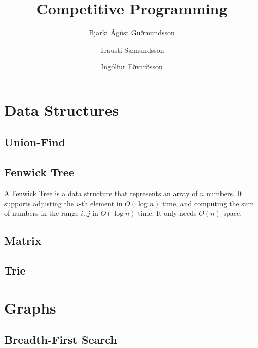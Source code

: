 \documentclass[11pt,a4paper,titlepage]{article}
\title{Competitive Programming}
\author{Bjarki Ágúst Guðmundsson \and Trausti Sæmundsson \and Ingólfur Eðvarðsson}
\begin{document}
	\maketitle
	\tableofcontents
	\newpage

	\section{Data Structures}

		\subsection{Union-Find}
			


		\subsection{Fenwick Tree}
			A Fenwick Tree is a data structure that represents an array of $n$ numbers. It supports adjusting the $i$-th element in $O(\log n)$ time, and computing the sum of numbers in the range $i..j$ in $O(\log n)$ time. It only needs $O(n)$ space.
			


		\subsection{Matrix}
			

		\subsection{Trie}
			

	\section{Graphs}

		\subsection{Breadth-First Search}
\end{document}
